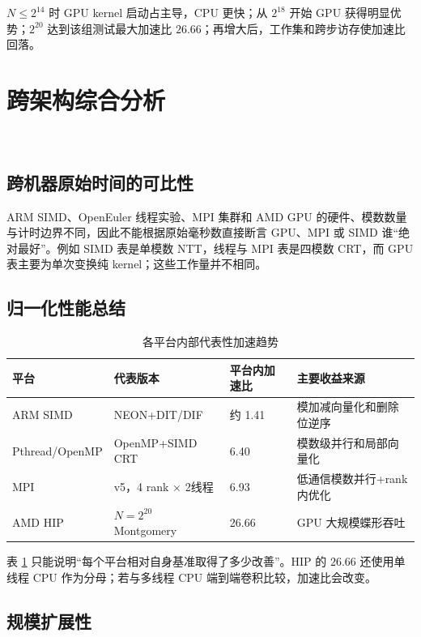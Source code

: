 $N\le2^{14}$ 时 GPU kernel 启动占主导，CPU 更快；从 $2^{18}$ 开始 GPU 获得明显优势；$2^{20}$ 达到该组测试最大加速比 $26.66$；再增大后，工作集和跨步访存使加速比回落。

\section{跨架构综合分析}\fusionwork\ \newwork

\subsection{跨机器原始时间的可比性}

ARM SIMD、OpenEuler 线程实验、MPI 集群和 AMD GPU 的硬件、模数数量与计时边界不同，因此不能根据原始毫秒数直接断言 GPU、MPI 或 SIMD 谁“绝对最好”。例如 SIMD 表是单模数 NTT，线程与 MPI 表是四模数 CRT，而 GPU 表主要为单次变换纯 kernel；这些工作量并不相同。

\subsection{归一化性能总结}

\begin{table}[H]
  \centering
  \caption{各平台内部代表性加速趋势}
  \label{tab:normalized-summary}
  \small
  \begin{tabularx}{\textwidth}{p{3.0cm} p{3.9cm} p{2.3cm} X}
    \toprule
    平台 & 代表版本 & 平台内加速比 & 主要收益来源 \\
    \midrule
    ARM SIMD & NEON+DIT/DIF & 约 1.41 & 模加减向量化和删除位逆序 \\
    Pthread/OpenMP & OpenMP+SIMD CRT & 6.40 & 模数级并行和局部向量化 \\
    MPI & v5，4 rank $\times$ 2线程 & 6.93 & 低通信模数并行+rank内优化 \\
    AMD HIP & $N=2^{20}$ Montgomery & 26.66 & GPU 大规模蝶形吞吐 \\
    \bottomrule
  \end{tabularx}
\end{table}

表 \ref{tab:normalized-summary} 只能说明“每个平台相对自身基准取得了多少改善”。HIP 的 $26.66$ 还使用单线程 CPU 作为分母；若与多线程 CPU 端到端卷积比较，加速比会改变。

\subsection{规模扩展性}

